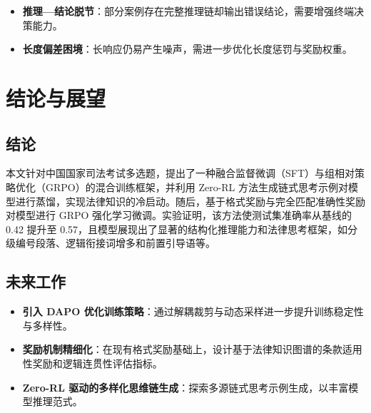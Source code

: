 \documentclass{pkuthesis}
\begin{document}
\begin{itemize}
  \item \textbf{推理—结论脱节}：部分案例存在完整推理链却输出错误结论，需要增强终端决策能力。
  \item \textbf{长度偏差困境}：长响应仍易产生噪声，需进一步优化长度惩罚与奖励权重。
\end{itemize}

\section{结论与展望}

\subsection{结论}
本文针对中国国家司法考试多选题，提出了一种融合监督微调（SFT）与组相对策略优化（GRPO）的混合训练框架，并利用 Zero-RL 方法生成链式思考示例对模型进行蒸馏，实现法律知识的冷启动。随后，基于格式奖励与完全匹配准确性奖励对模型进行 GRPO 强化学习微调。实验证明，该方法使测试集准确率从基线的 0.42 提升至 0.57，且模型展现出了显著的结构化推理能力和法律思考框架，如分级编号段落、逻辑衔接词增多和前置引导语等。

\subsection{未来工作}
\begin{itemize}
  \item \textbf{引入 DAPO 优化训练策略}：通过解耦裁剪与动态采样进一步提升训练稳定性与多样性。
  \item \textbf{奖励机制精细化}：在现有格式奖励基础上，设计基于法律知识图谱的条款适用性奖励和逻辑连贯性评估指标。
  \item \textbf{Zero-RL 驱动的多样化思维链生成}：探索多源链式思考示例生成，以丰富模型推理范式。
\end{itemize}



\printbibliography
\end{document}
